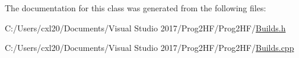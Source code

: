 The documentation for this class was generated from the following files\+:\begin{DoxyCompactItemize}
\item 
C\+:/\+Users/cxl20/\+Documents/\+Visual Studio 2017/\+Prog2\+H\+F/\+Prog2\+H\+F/\mbox{\hyperlink{_builds_8h}{Builds.\+h}}\item 
C\+:/\+Users/cxl20/\+Documents/\+Visual Studio 2017/\+Prog2\+H\+F/\+Prog2\+H\+F/\mbox{\hyperlink{_builds_8cpp}{Builds.\+cpp}}\end{DoxyCompactItemize}
